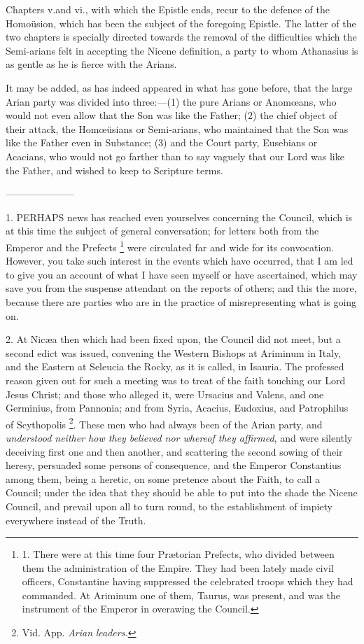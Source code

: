 Chapters v.\emph{}and vi.,
with which the Epistle ends, recur to the defence of the Homoüsion,
which has been the subject of the foregoing Epistle. The latter of the
two chapters is specially directed towards the removal of the
difficulties which the Semi-arians felt in accepting the Nicene
definition, a party to whom Athanasius is as gentle as he is fierce
with the Arians.

It may be added, as has indeed
appeared in what has gone before, that the large Arian party was
divided into three:—(1) the pure Arians or Anomœans, who would not
even allow that the Son was like the Father; (2) the chief object of
their attack, the Homœüsians or Semi-arians, who maintained that the
Son was like the Father even in Substance; (3) and the Court party,
Eusebians or Acacians, who would not go farther than to say vaguely
that our Lord was like the Father, and wished to keep to Scripture
terms.

———————



1. PERHAPS
news has reached even yourselves concerning the Council, which is at
this time the subject of general conversation; for letters both from
the Emperor and the Prefects \footnote{

1. There were at this time
four Prætorian Prefects, who divided between them the administration
of the Empire. They had been lately made civil officers, Constantine
having suppressed the celebrated troops which they had commanded. At
Ariminum one of them, Taurus, was present, and was the instrument of
the Emperor in overawing the Council.}
were circulated far and wide for its convocation. However, you take
such interest in the events which have occurred, that I am led to give
you an account of what I have seen myself or have ascertained, which
may save you from the suspense attendant on the reports of others; and
this the more, because there are parties who are in the practice of
misrepresenting what is going on.

2. At Nicæa then which had
been fixed upon, the Council did not meet, but a second edict was
issued, convening the Western Bishops at Ariminum in Italy, and the
Eastern at Seleucia the Rocky, as it is called, in Isauria. The
professed reason given out for such a meeting was to treat of the
faith touching our Lord Jesus Christ; and those who alleged it,
were Ursacius and Valens, and one Germinius, from Pannonia; and from
Syria, Acacius, Eudoxius, and Patrophilus of Scythopolis \footnote{Vid. App. \emph{Arian} \emph{leaders.}}. These men who had always been of the Arian party, and \emph{understood
neither how they believed nor whereof they affirmed}, and were
silently deceiving first one and then another, and scattering the
second sowing of their heresy, persuaded some persons of consequence,
and the Emperor Constantius among them, being a heretic, on some
pretence about the Faith, to call a Council; under the idea that they
should be able to put into the shade the Nicene Council, and prevail
upon all to turn round, to the establishment of impiety everywhere
instead of the Truth.


